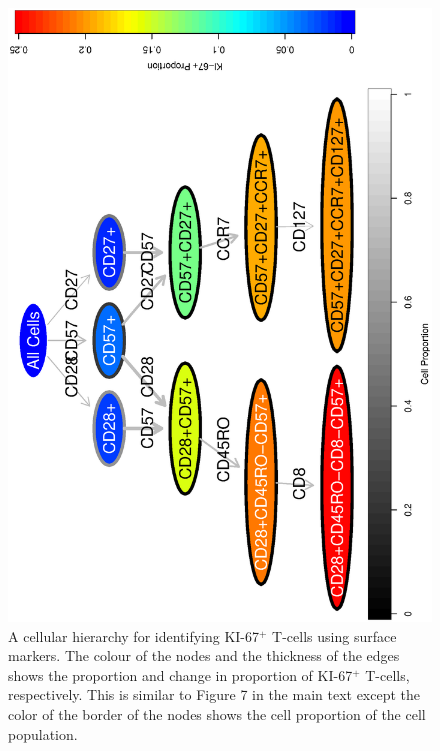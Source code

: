  \begin{figure}[!ht]
    \begin{center}
      \includegraphics[width=.7\textwidth, angle=270]{figs/rchy/figs/PropKI67Overlap}
    \end{center}
    \caption{A cellular hierarchy for identifying KI-67$^+$ T-cells using surface markers. The colour of the nodes and the thickness of the edges shows the proportion and change in proportion of KI-67$^+$ T-cells, respectively.
      This is similar to Figure 7 in the main text except the color of the border of the nodes shows the cell proportion of the cell population.}
    \label{r1:KI67Overlap}
  \end{figure}

